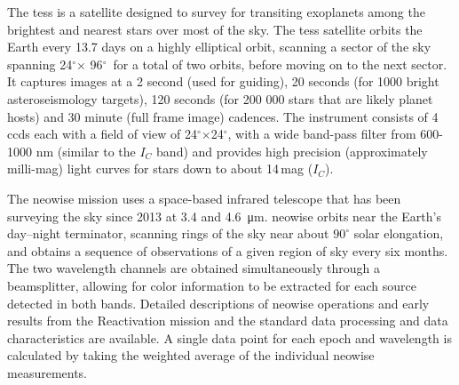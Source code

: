 \documentclass[sn-nature,oneside]{sn-jnl}%
\newcommand*\degr{\ensuremath{^\circ}}
\begin{document}




The \gls{tess} \cite[][]{2015JATIS...1a4003R} is a satellite designed to survey for transiting exoplanets among the brightest and nearest stars over most of the sky.
%
The \gls{tess} satellite orbits the Earth every 13.7 days on a highly elliptical orbit, scanning a sector of the sky spanning 24\degr $\times$ 96\degr\ for a total of two orbits, before moving on to the next sector. 
%
It captures images at a 2 second (used for guiding), 20 seconds (for 1000 bright asteroseismology targets), 120 seconds (for 200 000 stars that are likely planet hosts) and 30 minute (full frame image) cadences.
%
The instrument consists of 4 \glspl{ccd} each with a field of view of 24\degr$\times$24\degr, with a wide band-pass filter from 600-1000 nm (similar to the $I_C$ band) and provides high precision (approximately milli-mag) light curves for stars down to about 14\,mag ($I_C$).


The \gls{neowise} mission uses a space-based infrared telescope that has been surveying the sky since 2013 at 3.4 and \SI{4.6}{\micro\metre}.
%
\gls{neowise} orbits near the Earth's day--night terminator, scanning rings of the sky near about $90^\circ$ solar elongation, and obtains a sequence of observations of a given region of sky every six months.
%
The two wavelength channels are obtained simultaneously through a beamsplitter, allowing for color information to be extracted for each source detected in both bands.
%
Detailed descriptions of \gls{neowise} operations and early results from the Reactivation mission \cite{mainzer14neowise} and the standard data processing and data characteristics \cite{cutri15} are available.
%
A single data point for each epoch and wavelength is calculated by taking the weighted average of the individual \gls{neowise} measurements.
\end{document}
